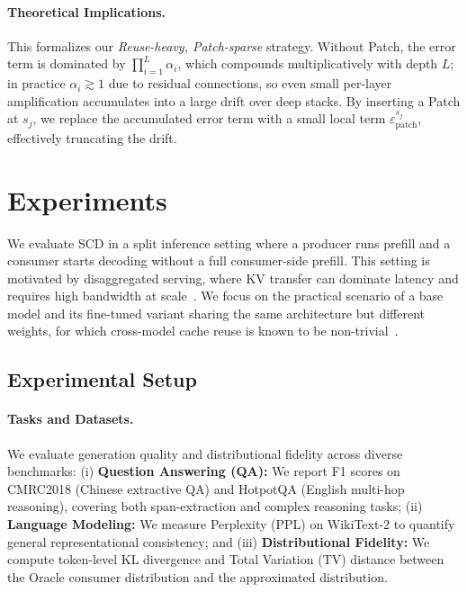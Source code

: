 \documentclass{article}
\theoremstyle{plain}
\theoremstyle{definition}
\theoremstyle{remark}
\begin{document}
\paragraph{Theoretical Implications.}
This formalizes our \textit{Reuse-heavy, Patch-sparse} strategy.
Without Patch, the error term is dominated by $\prod_{i=1}^L \alpha_i$, which compounds multiplicatively with depth $L$; in practice $\alpha_i \gtrsim 1$ due to residual connections, so even small per-layer amplification accumulates into a large drift over deep stacks.
By inserting a Patch at $s_j$, we replace the accumulated error term with a small local term $\varepsilon_{\mathrm{patch}}^{s_j}$, effectively truncating the drift.


\section{Experiments}
\label{sec:experiments}

We evaluate SCD in a split inference setting where a producer runs prefill and a consumer starts decoding without a full consumer-side prefill.
This setting is motivated by disaggregated serving, where KV transfer can dominate latency and requires high bandwidth at scale~\citep{zhong2024distserve}.
We focus on the practical scenario of a base model and its fine-tuned variant sharing the same architecture but different weights, for which cross-model cache reuse is known to be non-trivial~\citep{liu2024droidspeak}.







\subsection{Experimental Setup}
\label{subsec:exp_setup}

\paragraph{Tasks and Datasets.}
We evaluate generation quality and distributional fidelity across diverse benchmarks:
(i) \textbf{Question Answering (QA):} We report F1 scores on CMRC2018 (Chinese extractive QA) and HotpotQA (English multi-hop reasoning), covering both span-extraction and complex reasoning tasks;
(ii) \textbf{Language Modeling:} We measure Perplexity (PPL) on WikiText-2 to quantify general representational consistency; and
(iii) \textbf{Distributional Fidelity:} We compute token-level KL divergence and Total Variation (TV) distance between the Oracle consumer distribution and the approximated distribution.
\end{document}
